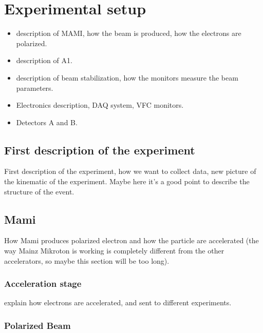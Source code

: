 \chapter{Experimental setup} \label{experiment}

\begin{itemize}
\item description of MAMI, how the beam is produced, how the electrons are polarized.
\item description of A1.
\item description of beam stabilization, how the monitors measure the beam parameters.
\item Electronics description, DAQ system, VFC monitors.
\item Detectors A and B.
\end{itemize}

\section{First description of the experiment}

First description of the experiment, how we want to collect data, new picture of the kinematic of the experiment. Maybe here it's a good point to describe the structure of the event.

\section{Mami}
How Mami produces polarized electron and how the particle are accelerated (the way Mainz Mikroton is working is completely different from the other accelerators, so maybe this section will be too long).

\subsection{Acceleration stage}
explain how electrons are accelerated, and sent to different experiments.


\subsection{Polarized Beam}

